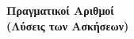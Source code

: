 




\setlength{\columnseprule}{1pt}
\setlength{\columnsep}{20pt}
\def\columnseprulecolor{\color{Col1}}




\pagestyle{vangelis}

\begin{center}
  \large\bfseries\textcolor{Col2}{Πραγματικοί Αριθμοί} \\
  \large\bfseries\textcolor{Col2}{(Λύσεις των Ασκήσεων)}
\end{center}

\vspace{\baselineskip}

\begin{multicols}{2}


\end{multicols}
